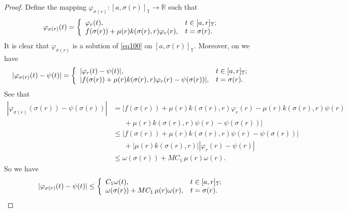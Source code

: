 \documentclass{article}
\begin{document}
\begin{proof}
Define the mapping $\varphi_{\sigma(r)}:[a,\sigma(r)]_\mathbb{T}\rightarrow \mathbb{R}$ such that
\begin{equation*}
\varphi_{\sigma(r)}(t)=
      \left\{
        \begin{array}{ll}
          \varphi_{r}(t), & \hbox{$t\in [a,r]_\mathbb{T}$;} \\
          f(\sigma(r))+\mu(r)k(\sigma(r),r)\varphi_{r}(r), & \hbox{$t=\sigma(r)$.}
        \end{array}
      \right.
\end{equation*}
It is clear that $\varphi_{\sigma(r)}$ is a solution of \eqref{eq100} on $[a,\sigma(r)]_\mathbb{T}$. Moreover, on we have
\begin{equation*}
|\varphi_{\sigma(r)}(t)-\psi(t)|=
      \left\{
        \begin{array}{ll}
          |\varphi_{r}(t)-\psi(t)|, & \hbox{$t\in [a,r]_\mathbb{T}$;} \\
          |f(\sigma(r))+\mu(r)k(\sigma(r),r)\varphi_{r}(r)-\psi(\sigma(r))|, & \hbox{$t=\sigma(r)$.}
        \end{array}
      \right.
\end{equation*}
See that
\begin{align*}
|\varphi_{\sigma(r)}(\sigma(r))-\psi(\sigma(r))|&=|f(\sigma(r))+\mu(r)k(\sigma(r),r)\varphi_{r}(r)-\mu(r)k(\sigma(r),r)\psi(r)\\
&\ \ \ \ \ \ \ +\mu(r)k(\sigma(r),r)\psi(r)-\psi(\sigma(r))|\\
&\leq |f(\sigma(r))+\mu(r)k(\sigma(r),r)\psi(r)-\psi(\sigma(r))|\\
&\ \ \ \ \ \ \ +|\mu(r)k(\sigma(r),r)||\varphi_{r}(r)-\psi(r)|\\
&\leq \omega(\sigma(r))+MC_1\,\mu(r)\omega(r).
\end{align*}
So we have
\begin{equation*}
|\varphi_{\sigma(r)}(t)-\psi(t)|\leq
     \left\{
       \begin{array}{ll}
         C_1\omega(t), & \hbox{$t\in [a,r]_\mathbb{T}$;} \\
         \omega(\sigma(r))+MC_1\,\mu(r)\omega(r), & \hbox{$t=\sigma(r)$.}
       \end{array}
     \right.
\end{equation*}


\end{proof}
\end{document}

